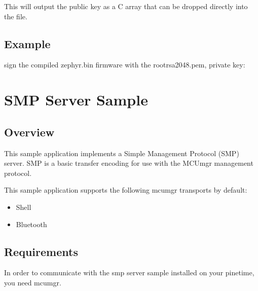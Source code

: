 \documentclass[letterpaper,10pt,english]{sphinxmanual}
\begin{document}
This will output the public key as a C array that can be dropped
directly into the  file.


\subsection{Example}
\label{\detokenize{fota/signing:example}}
sign the compiled zephyr.bin firmware with the root\sphinxhyphen{}rsa\sphinxhyphen{}2048.pem, private key:

\begin{sphinxVerbatim}[commandchars=\\\{\}]
\end{sphinxVerbatim}


\section{SMP Server Sample}
\label{\detokenize{fota/smp_svr:smp-server-sample}}\label{\detokenize{fota/smp_svr:smp-svr-sample}}\label{\detokenize{fota/smp_svr::doc}}

\subsection{Overview}
\label{\detokenize{fota/smp_svr:overview}}
This sample application implements a Simple Management Protocol (SMP) server.
SMP is a basic transfer encoding for use with the MCUmgr management protocol.

This sample application supports the following mcumgr transports by default:
\begin{itemize}
\item {} 
Shell

\item {} 
Bluetooth

\end{itemize}


\subsection{Requirements}
\label{\detokenize{fota/smp_svr:requirements}}
In order to communicate with the smp server sample installed on your pinetime, you need mcumgr.
\end{document}
